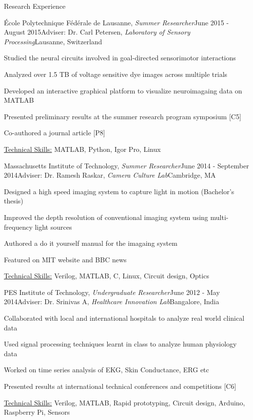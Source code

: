 \documentclass{resume}
\begin{document}
\begin{rSection}{Research Experience}
    \begin{rSubsection}{École Polytechnique Fédérale de Lausanne, \textit{Summer Researcher}}{June 2015 - August 2015}{Adviser: Dr. Carl Petersen, \textit{Laboratory of Sensory Processing}}{Lausanne, Switzerland}
\item Studied the neural circuits involved in goal-directed sensorimotor interactions
\item Analyzed over 1.5 TB of voltage sensitive dye images across multiple trials
\item Developed an interactive graphical platform to visualize neuroimagaing data on MATLAB
\item Presented preliminary results at the summer research program symposium [C5]
\item Co-authored a journal article [P8]
\item \uline{Technical Skills:} MATLAB, Python, Igor Pro, Linux
    \end{rSubsection}
    \begin{rSubsection}{Massachusetts Institute of Technology, \textit{Summer Researcher}}{June 2014 - September 2014}{Adviser: Dr. Ramesh Raskar, \textit{Camera Culture Lab}}{Cambridge, MA}
\item Designed a high speed imaging system to capture light in motion (Bachelor's thesis)
\item Improved the depth resolution of conventional imaging system using multi-frequency light sources
\item Authored a do it yourself manual for the imagaing system
\item Featured on MIT website and BBC news
\item \uline{Technical Skills:} Verilog, MATLAB, C, Linux, Circuit design, Optics
    \end{rSubsection}
    
 \begin{rSubsection}{PES Institute of Technology, \textit{Undergraduate Researcher}}{June 2012 - May 2014}{Adviser: Dr. Srinivas A, \textit{Healthcare Innovation Lab}}{Bangalore, India}
\item Collaborated with local and international hospitals to analyze real world clinical data
\item Used signal processing techniques learnt in class to analyze human physiology data
\item Worked on time series analysis of EKG, Skin Conductance, ERG etc
\item Presented results at international technical conferences and competitions [C6]
\item \uline{Technical Skills:} Verilog, MATLAB, Rapid prototyping, Circuit design, Arduino, Raspberry Pi, Sensors
 \end{rSubsection}
  \end{rSection}
\end{document}

